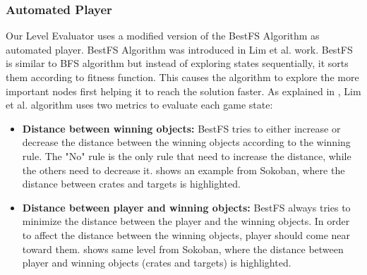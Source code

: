 \subsubsection{Automated Player}
Our Level Evaluator uses a modified version of the BestFS Algorithm as automated player. BestFS Algorithm was introduced in Lim et al.\cite{puzzleScriptGeneration} work. BestFS is similar to BFS algorithm but instead of exploring states sequentially, it sorts them according to fitness function. This causes the algorithm to explore the more important nodes first helping it to reach the solution faster. As explained in , Lim et al. algorithm uses two metrics to evaluate each game state:
\begin{itemize} \itemsep0pt \parskip0pt 
	\item \textbf{Distance between winning objects:} BestFS tries to either increase or decrease the distance between the winning objects according to the winning rule. The "No" rule is the only rule that need to increase the distance, while the others need to decrease it.  shows an example from Sokoban, where the distance between crates and targets is highlighted.
	\item \textbf{Distance between player and winning objects:} BestFS always tries to minimize the distance between the player and the winning objects. In order to affect the distance between the winning objects, player should come near toward them.  shows same level from Sokoban, where the distance between player and winning objects (crates and targets) is highlighted.
\end{itemize}

